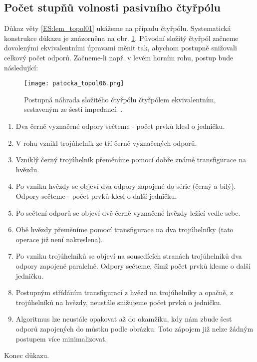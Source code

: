     \subsection{Počet stupňů volnosti pasivního čtyřpólu}\label{teo:IchapIIIsecIsubV}
      Důkaz věty \ref{ES:lem_topol01} ukážeme na případu čtyřpólu. Systematická konstrukce důkazu 
      je znázorněna na obr. \ref{es:fig_patocka_topol06}. Původní složitý čtyřpól začneme 
      dovolenými ekvivalentními úpravami měnit tak, abychom postupně snižovali celkový počet 
      odporů. Začneme-li např. v levém horním rohu, postup bude následující:
      \begin{figure}[ht!]   %
        \centering
        \texttt{[image: patocka\_topol06.png]}
        \caption{Postupná náhrada složitého čtyřpólu čtyřpólem ekvivalentním, sestaveným ze šesti
                 impedancí. \cite[s.~48]{Patocka4}.}
        \label{es:fig_patocka_topol06}
      \end{figure}
      \begin{enumerate}[noitemsep]
        \item Dva černě vyznačené odpory sečteme - počet prvků klesl o jedničku.
        \item V rohu vznikl trojúhelník ze tří černě vyznačených odporů.        
        \item Vzniklý černý trojúhelník přeměníme pomocí dobře známé transfigurace na hvězdu.
        \item Po vzniku hvězdy se objeví dva odpory zapojené do série (černý a bílý). Odpory 
              sečteme - počet prvků klesl o další jedničku.
        \item Po sečtení odporů se objeví dvě černě vyznačené hvězdy ležící vedle sebe.
        \item Obě hvězdy přeměníme pomocí transfigurace na dva trojúhelníky (tato operace již není 
              nakreslena).
        \item Po vzniku trojúhelníků se objeví na sousedících stranách trojúhelníků dva odpory 
              zapojené paralelně. Odpory sečteme, čímž počet prvků klesne o další jedničku.
        \item Postupným střídáním transfigurací z hvězd na trojúhelníky a opačně, z trojúhelníků na 
              hvězdy, neustále snižujeme počet prvků o jedničku.
        \item Algoritmus lze neustále opakovat až do okamžiku, kdy nám zbude šest odporů zapojených 
              do můstku podle obrázku. Toto zápojem již nelze žádným postupem více minimalizovat.
      \end{enumerate}
      Konec důkazu.
      
